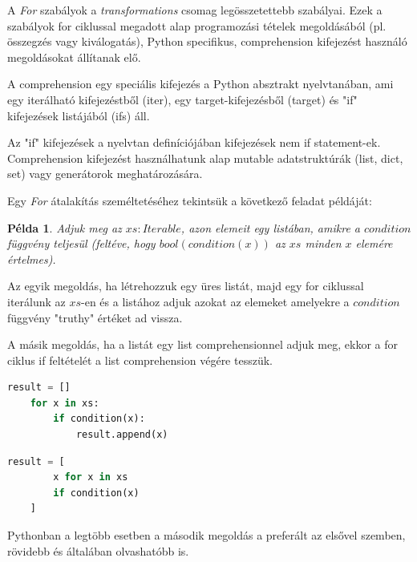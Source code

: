 A \emph{For} szabályok a \emph{transformations} csomag legösszetettebb szabályai.
Ezek a szabályok for ciklussal megadott alap programozási tételek megoldásából
(pl. összegzés vagy kiválogatás), Python specifikus, comprehension kifejezést használó
megoldásokat állítanak elő.

A comprehension egy speciális kifejezés a Python absztrakt nyelvtanában, ami
egy iterálható kifejezéstből (iter), egy target-kifejezésből (target)
és "if" kifejezések listájából (ifs) áll.

Az "if" kifejezések a nyelvtan definíciójában kifejezések nem if statement-ek.
Comprehension kifejezést használhatunk alap
mutable adatstruktúrák (list, dict, set) vagy generátorok meghatározására.

Egy \emph{For} átalakítás személtetéséhez tekintsük a következő feladat példáját:

\newtheorem{example}{Példa}
\begin{example}
Adjuk meg az $xs: Iterable$, azon elemeit egy listában,
amikre a $condition$ függvény teljesül
(feltéve, hogy $bool(condition(x))$ az $xs$ minden $x$ elemére értelmes).
\end{example}

Az egyik megoldás, ha létrehozzuk egy üres listát,
majd egy for ciklussal iterálunk az $xs$-en és
a listához adjuk azokat az elemeket amelyekre a $condition$ függvény
"truthy" értéket ad vissza.

A másik megoldás, ha a listát egy list comprehensionnel adjuk meg,
ekkor a for ciklus if feltételét a list comprehension végére tesszük.

\noindent
\begin{minipage}[t]{.48\textwidth}
\begin{lstlisting}[language={Python}]
	result = []
	for x in xs:
		if condition(x):
			result.append(x)
\end{lstlisting}
\end{minipage}
\hfill
\begin{minipage}[t]{.48\textwidth}
\begin{lstlisting}[language={Python}]
	result = [
		x for x in xs
		if condition(x)
	]
\end{lstlisting}
\end{minipage}

Pythonban a legtöbb esetben a második megoldás a preferált az elsővel szemben,
rövidebb és általában olvashatóbb is.

